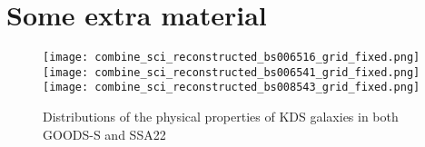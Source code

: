 \documentclass[a4paper,fleqn,usenatbib]{mn2e}
\begin{document}


\appendix

\section{Some extra material}

\begin{figure*}
\centering
\texttt{[image: combine\_sci\_reconstructed\_bs006516\_grid\_fixed.png]}
\texttt{[image: combine\_sci\_reconstructed\_bs006541\_grid\_fixed.png]}
\texttt{[image: combine\_sci\_reconstructed\_bs008543\_grid\_fixed.png]}
\caption{Distributions of the physical properties of KDS galaxies in both GOODS-S and SSA22}
\label{fig:grids}
\end{figure*}



\bsp    %
\label{lastpage}
\end{document}
